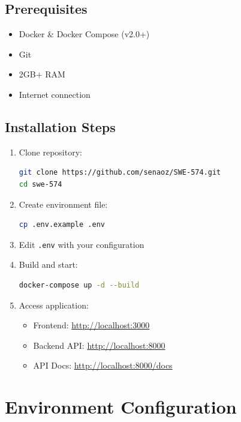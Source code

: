 \documentclass[12pt,a4paper]{report}
\begin{document}
\subsection{Prerequisites}

\begin{itemize}
    \item Docker \& Docker Compose (v2.0+)
    \item Git
    \item 2GB+ RAM
    \item Internet connection
\end{itemize}

\subsection{Installation Steps}

\begin{enumerate}
    \item Clone repository:
          \begin{lstlisting}[language=bash]
git clone https://github.com/senaoz/SWE-574.git
cd swe-574
    \end{lstlisting}

    \item Create environment file:
          \begin{lstlisting}[language=bash]
cp .env.example .env
    \end{lstlisting}

    \item Edit \texttt{.env} with your configuration

    \item Build and start:
          \begin{lstlisting}[language=bash]
docker-compose up -d --build
    \end{lstlisting}

    \item Access application:
          \begin{itemize}
              \item Frontend: \url{http://localhost:3000}
              \item Backend API: \url{http://localhost:8000}
              \item API Docs: \url{http://localhost:8000/docs}
          \end{itemize}
\end{enumerate}

\section{Environment Configuration}
\end{document}
